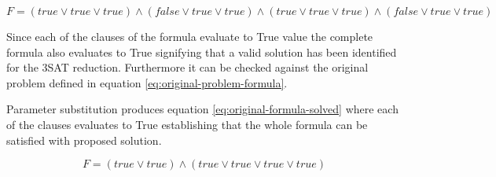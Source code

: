 \begin{equation}\label{eq:3sat-solved-formula}
F = (true \lor true \lor true) \land (false \lor true \lor true) \land (true \lor true \lor true) \land(false \lor true \lor true)
\end{equation}

Since each of the clauses of the formula evaluate to True value the complete formula also evaluates to True signifying that a valid solution has been identified for the 3SAT reduction. Furthermore it can be checked against the original problem defined in equation \ref{eq:original-problem-formula}.

Parameter substitution produces equation \ref{eq:original-formula-solved} where each of the clauses evaluates to True establishing that the whole formula can be satisfied with proposed solution.

\begin{equation}\label{eq:original-formula-solved}
F = (true \lor true) \land (true \lor true \lor true \lor true) 
\end{equation}

